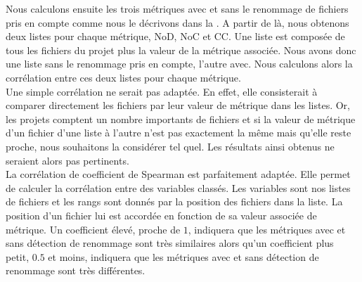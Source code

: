 Nous calculons ensuite les trois métriques avec et sans le renommage de fichiers pris en compte comme nous le décrivons dans la . A partir de là, nous obtenons deux listes pour chaque métrique, NoD, NoC et CC. Une liste est composée de tous les fichiers du projet plus la valeur de la métrique associée. Nous avons donc une liste sans le renommage pris en compte, l'autre avec. Nous calculons alors la corrélation entre ces deux listes pour chaque métrique.\\ 

Une simple corrélation ne serait pas adaptée. En effet, elle consisterait à comparer directement les fichiers par leur valeur de métrique dans les listes. Or, les projets comptent un nombre importants de fichiers et si la valeur de métrique d'un fichier d'une liste à l'autre n'est pas exactement la même mais qu'elle reste proche, nous souhaitons la considérer tel quel. Les résultats ainsi obtenus ne seraient alors pas pertinents. \\ 

La corrélation de coefficient de Spearman est parfaitement adaptée. Elle permet de calculer la corrélation entre des variables classés. Les variables sont nos listes de fichiers et les rangs sont donnés par la position des fichiers dans la liste. La position d'un fichier lui est accordée en fonction de sa valeur associée de métrique. Un coefficient élevé, proche de $1$, indiquera que les métriques avec et sans détection de renommage sont très similaires alors qu'un coefficient plus petit, $0.5$ et moins, indiquera que les métriques avec et sans détection de renommage sont très différentes.\\  
